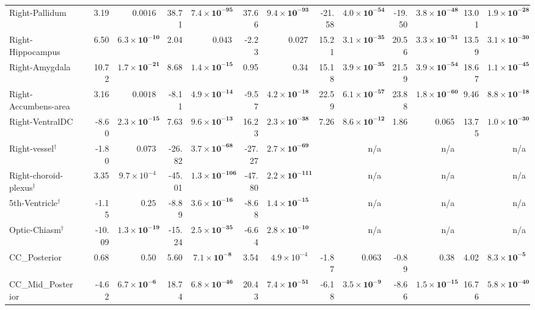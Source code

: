 {\begin{longtable}{llrrrrrrrrrrrr}
Right-Pallidum &  & 3.19 & $0.0016$ & 38.71 & $\mathbf{7.4{\times}10^{-95}}$ & 37.66 & $\mathbf{9.4{\times}10^{-93}}$ & -21.58 & $\mathbf{4.0{\times}10^{-54}}$ & -19.50 & $\mathbf{3.8{\times}10^{-48}}$ & 13.01 & $\mathbf{1.9{\times}10^{-28}}$ \\
Right-Hippocampus &  & 6.50 & $\mathbf{6.3{\times}10^{-10}}$ & 2.04 & $0.043$ & -2.23 & $0.027$ & 15.21 & $\mathbf{3.1{\times}10^{-35}}$ & 20.56 & $\mathbf{3.3{\times}10^{-51}}$ & 13.59 & $\mathbf{3.1{\times}10^{-30}}$ \\
Right-Amygdala &  & 10.72 & $\mathbf{1.7{\times}10^{-21}}$ & 8.68 & $\mathbf{1.4{\times}10^{-15}}$ & 0.95 & $0.34$ & 15.18 & $\mathbf{3.9{\times}10^{-35}}$ & 21.59 & $\mathbf{3.9{\times}10^{-54}}$ & 18.67 & $\mathbf{1.1{\times}10^{-45}}$ \\
Right-Accumbens-area &  & 3.16 & $0.0018$ & -8.11 & $\mathbf{4.9{\times}10^{-14}}$ & -9.57 & $\mathbf{4.2{\times}10^{-18}}$ & 22.59 & $\mathbf{6.1{\times}10^{-57}}$ & 23.88 & $\mathbf{1.8{\times}10^{-60}}$ & 9.46 & $\mathbf{8.8{\times}10^{-18}}$ \\
Right-VentralDC &  & -8.60 & $\mathbf{2.3{\times}10^{-15}}$ & 7.63 & $\mathbf{9.6{\times}10^{-13}}$ & 16.23 & $\mathbf{2.3{\times}10^{-38}}$ & 7.26 & $\mathbf{8.6{\times}10^{-12}}$ & 1.86 & $0.065$ & 13.75 & $\mathbf{1.0{\times}10^{-30}}$ \\
Right-vessel$^{\dagger}$ &  & -1.80 & $0.073$ & -26.82 & $\mathbf{3.7{\times}10^{-68}}$ & -27.27 & $\mathbf{2.7{\times}10^{-69}}$ &  & n/a &  & n/a &  & n/a \\
Right-choroid-plexus$^{\dagger}$ &  & 3.35 & $9.7{\times}10^{-4}$ & -45.01 & $\mathbf{1.3{\times}10^{-106}}$ & -47.80 & $\mathbf{2.2{\times}10^{-111}}$ &  & n/a &  & n/a &  & n/a \\
5th-Ventricle$^{\dagger}$ &  & -1.15 & $0.25$ & -8.89 & $\mathbf{3.6{\times}10^{-16}}$ & -8.68 & $\mathbf{1.4{\times}10^{-15}}$ &  & n/a &  & n/a &  & n/a \\
Optic-Chiasm$^{\dagger}$ &  & -10.09 & $\mathbf{1.3{\times}10^{-19}}$ & -15.24 & $\mathbf{2.5{\times}10^{-35}}$ & -6.64 & $\mathbf{2.8{\times}10^{-10}}$ &  & n/a &  & n/a &  & n/a \\
CC\_Posterior &  & 0.68 & $0.50$ & 5.60 & $\mathbf{7.1{\times}10^{-8}}$ & 3.54 & $4.9{\times}10^{-4}$ & -1.87 & $0.063$ & -0.89 & $0.38$ & 4.02 & $\mathbf{8.3{\times}10^{-5}}$ \\
CC\_Mid\_Posterior &  & -4.62 & $\mathbf{6.7{\times}10^{-6}}$ & 18.74 & $\mathbf{6.8{\times}10^{-46}}$ & 20.43 & $\mathbf{7.4{\times}10^{-51}}$ & -6.18 & $\mathbf{3.5{\times}10^{-9}}$ & -8.66 & $\mathbf{1.5{\times}10^{-15}}$ & 16.76 & $\mathbf{5.8{\times}10^{-40}}$ \\

\end{longtable}}
